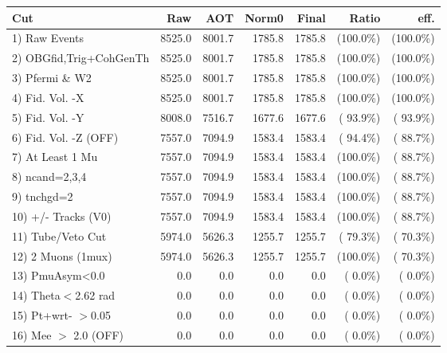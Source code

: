  \begin{table}[h!]\centering
 \begin{tabular}{||l||r|r|r|r|r|r||}
 \hline
 \hline
 Cut & Raw & AOT & Norm0 & Final & Ratio & eff.       \\
 \hline
  1) Raw Events           &       8525.0 &       8001.7 &       1785.8 &       1785.8 & (100.0\%) & (100.0\%) \\
  2) OBGfid,Trig+CohGenTh &       8525.0 &       8001.7 &       1785.8 &       1785.8 & (100.0\%) & (100.0\%) \\
  3) Pfermi \& W2         &       8525.0 &       8001.7 &       1785.8 &       1785.8 & (100.0\%) & (100.0\%) \\
  4) Fid. Vol. -X         &       8525.0 &       8001.7 &       1785.8 &       1785.8 & (100.0\%) & (100.0\%) \\
  5) Fid. Vol. -Y         &       8008.0 &       7516.7 &       1677.6 &       1677.6 & ( 93.9\%) & ( 93.9\%) \\
  6) Fid. Vol. -Z (OFF)   &       7557.0 &       7094.9 &       1583.4 &       1583.4 & ( 94.4\%) & ( 88.7\%) \\
  7) At Least 1 Mu        &       7557.0 &       7094.9 &       1583.4 &       1583.4 & (100.0\%) & ( 88.7\%) \\
  8) ncand=2,3,4          &       7557.0 &       7094.9 &       1583.4 &       1583.4 & (100.0\%) & ( 88.7\%) \\
  9) tnchgd=2             &       7557.0 &       7094.9 &       1583.4 &       1583.4 & (100.0\%) & ( 88.7\%) \\
 10) +/- Tracks (V0)      &       7557.0 &       7094.9 &       1583.4 &       1583.4 & (100.0\%) & ( 88.7\%) \\
 11) Tube/Veto Cut        &       5974.0 &       5626.3 &       1255.7 &       1255.7 & ( 79.3\%) & ( 70.3\%) \\
 12) 2 Muons (1mux)       &       5974.0 &       5626.3 &       1255.7 &       1255.7 & (100.0\%) & ( 70.3\%) \\
 13) PmuAsym<0.0          &          0.0 &          0.0 &          0.0 &          0.0 & (  0.0\%) & (  0.0\%) \\
 14) Theta$<$2.62 rad     &          0.0 &          0.0 &          0.0 &          0.0 & (  0.0\%) & (  0.0\%) \\
 15) Pt+wrt- $>$0.05      &          0.0 &          0.0 &          0.0 &          0.0 & (  0.0\%) & (  0.0\%) \\
 16) Mee $>$ 2.0  (OFF)   &          0.0 &          0.0 &          0.0 &          0.0 & (  0.0\%) & (  0.0\%) \\

\end{tabular}
\end{table}
